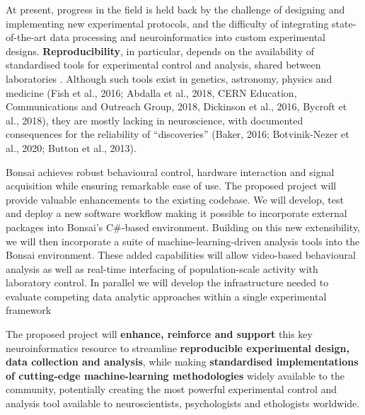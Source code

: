 At present, progress in the field is held back by the challenge of designing and implementing new experimental protocols, and the difficulty of integrating state-of-the-art data processing and neuroinformatics into custom experimental designs.
%
\textbf{Reproducibility}, in particular, depends on the availability of
standardised tools for experimental control and analysis, shared between
laboratories \citep{baker16,ioannidis05}. Although such tools exist in genetics, astronomy, physics and medicine (Fish et al., 2016; Abdalla et al., 2018, CERN Education, Communications and Outreach Group, 2018, Dickinson et al., 2016, Bycroft et al., 2018), they are mostly lacking in neuroscience, with documented consequences for the reliability of ``discoveries'' (Baker, 2016; Botvinik-Nezer et al., 2020; Button et al., 2013). 




Bonsai achieves robust behavioural control, hardware interaction and signal acquisition while ensuring remarkable ease of use.  The proposed project will provide valuable enhancements to the existing codebase.  We will develop, test and deploy a new software workflow making it possible to incorporate external packages into Bonsai's C\#-based environment.  Building on this new extensibility, we will then incorporate a suite of machine-learning-driven analysis tools into the Bonsai environment.  These added capabilities will allow  video-based behavioural analysis as well as real-time interfacing of population-scale activity with laboratory control.  In parallel we will develop the infrastructure needed to evaluate competing data analytic approaches within a single experimental framework

The proposed project will \textbf{enhance, reinforce and support} this key neuroinformatics
resource to streamline \textbf{reproducible experimental design, data collection and analysis}, while making \textbf{standardised implementations of cutting-edge machine-learning methodologies} widely available to the community, potentially creating the most powerful experimental
control and analysis tool available to neuroscientists, psychologists and
ethologists worldwide.




%
%

